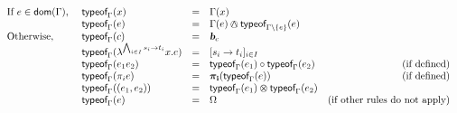 \documentclass[a4paper]{article}
\theoremstyle{definition}
\begin{document}
    \begin{align*}
      \begin{array}{llclr}
      \text{If } e \in \dom \Gamma \text{, } & \tyof x \Gamma &=& \Gamma(x)\\
      & \tyof e \Gamma &=& \Gamma(e) \tsand \tyof e {\Gamma\setminus\{e\}}\\
      \text{Otherwise,} & \tyof c \Gamma &=& \basic{c}\\
      &\tyof {\lambda^{\bigwedge_{i\in I} \arrow {s_i} {t_i}}x.e} \Gamma &=& \tsfun {\arrow {s_i} {t_i}}_{i\in I}\\
      &\tyof {{e_1} {e_2}} \Gamma &=& \apply {\tyof {e_1} \Gamma} {\tyof {e_2} \Gamma} & \text{(if defined)}\\
      &\tyof {\pi_i e} \Gamma &=& \bpi_{\mathbf{i}}(\tyof e \Gamma) & \text{(if defined)}\\
      &\tyof {(e_1,e_2)} \Gamma &=& \tyof {e_1} \Gamma \tstimes \tyof {e_2} \Gamma\\%
      &\tyof {e} \Gamma &=& \tsempty & \text{(if other rules do not apply)}
    \end{array}
    \end{align*}

  
\end{document}
